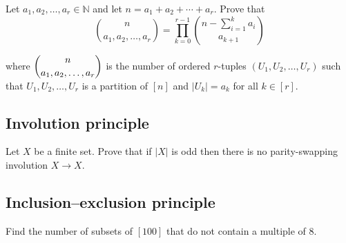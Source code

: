\begin{chapex}
Let $a_1,a_2,\dots,a_r \in \mathbb{N}$ and let $n = a_1 + a_2 + \cdots + a_r$. Prove that
\[
\binom{n}{a_1,a_2,\dots,a_r} = \prod_{k=0}^{r-1} \binom{n - \sum_{i=1}^k a_i}{a_{k+1}}
\]
\end{chapex}
where $\dbinom{n}{a_1,a_2,\dots,a_r}$ is the number of ordered $r$-tuples $(U_1, U_2, \dots, U_r)$ such that $U_1, U_2, \dots, U_r$ is a partition of $[n]$ and $|U_k| = a_k$ for all $k \in [r]$.

\subsection*{Involution principle}

\begin{chapex}
Let $X$ be a finite set. Prove that if $|X|$ is odd then there is no parity-swapping involution $X \to X$.
\end{chapex}

\subsection*{Inclusion--exclusion principle}

\begin{chapex}
Find the number of subsets of $[100]$ that do not contain a multiple of $8$.
\end{chapex}